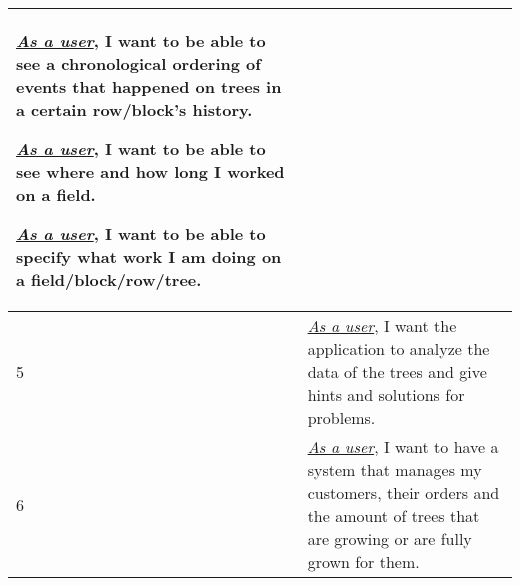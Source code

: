 \begin{tabular}{| p{} | p{} |}
	\underline{\textit{As a user}}, I want to be able to see a chronological ordering of events that happened on trees in a certain row/block's history.
	
	\underline{\textit{As a user}}, I want to be able to see where and how long I worked on a field.
	
	\underline{\textit{As a user}}, I want to be able to specify what work I am doing on a field/block/row/tree.\\
	\hline
	5 & \underline{\textit{As a user}}, I want the application to analyze the data of the trees and give hints and solutions for problems.\\
	\hline
	6 & \underline{\textit{As a user}}, I want to have a system that manages my customers, their orders and the amount of trees that are growing or are fully grown for them.\\
	\hline
\end{tabular}